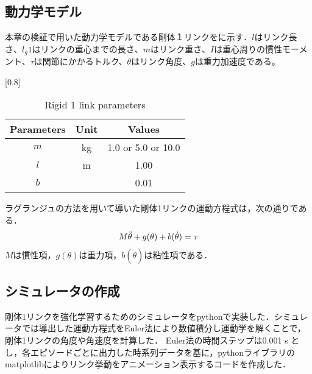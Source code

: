 \begin{small}
\subsection{動力学モデル}
本章の検証で用いた動力学モデルである剛体１リンクをに示す．$l$はリンク長さ、$l_g{1}$はリンクの重心までの長さ、$m$はリンク重さ、$I$は重心周りの慣性モーメント、$\tau$は関節にかかるトルク、$\theta$はリンク角度、$g$は重力加速度である。
\begin{table}[tb]
  \begin{center}
    \caption{Rigid 1 link parameters}
    \scalebox{0.8}[0.8]{
    \begin{tabular}{c|c|c}
      \hline
      Parameters & Unit & Values \\
      \hline
      $m$ & kg & 1.0 or 5.0 or 10.0\\
      $l$ & m & 1.00 \\
      $b$ &  & 0.01 \\
      \hline
    \end{tabular}
    }
  \end{center}
\end{table}
ラグランジュの方法\cite{lagrange}を用いて導いた剛体1リンクの運動方程式は，次の通りである．\\
\begin{eqnarray}
  \equlabel{2}
  M\ddot{\theta} + g(\theta) + b(\dot{\theta}) = \tau
\end{eqnarray}
$M$は慣性項，$g(\theta)$は重力項，$b(\dot{\theta})$は粘性項である．
\subsection{シミュレータの作成}
剛体1リンクを強化学習するためのシミュレータをpythonで実装した．シミュレータでは導出した運動方程式をEuler法\cite{euler}により数値積分し運動学を解くことで，剛体1リンクの角度や角速度を計算した．
Euler法の時間ステップは0.001 s とし，各エピソードごとに出力した時系列データを基に，pythonライブラリのmatplotlibによりリンク挙動をアニメーション表示するコードを作成した．

\end{small}
